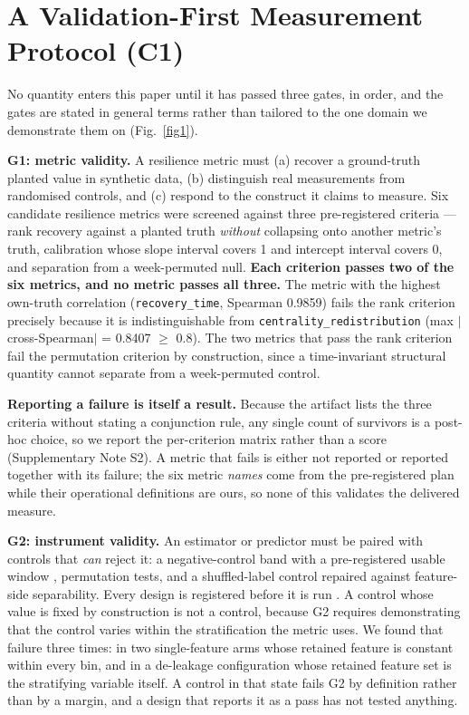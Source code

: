 \section{A Validation-First Measurement Protocol (C1)}

No quantity enters this paper until it has passed three gates, in order, and the
gates are stated in general terms rather than tailored to the one domain we
demonstrate them on (Fig.~\ref{fig1}).

\textbf{G1: metric validity.} A resilience metric must (a) recover a
ground-truth planted value in synthetic data, (b) distinguish real measurements
from randomised controls, and (c) respond to the construct it claims to measure.
Six candidate resilience metrics were screened against three pre-registered
criteria --- rank recovery against a planted truth \emph{without} collapsing onto
another metric's truth, calibration whose slope interval covers 1 and intercept
interval covers 0, and separation from a week-permuted null. \textbf{Each
criterion passes two of the six metrics, and no metric passes all three.} The
metric with the highest own-truth correlation (\texttt{recovery\_time}, Spearman
0.9859) fails the rank criterion precisely because it is indistinguishable from
\texttt{centrality\_redistribution} (max $|$cross-Spearman$|$ = 0.8407 $\geq$
0.8). The two metrics that pass the rank criterion fail the permutation
criterion by construction, since a time-invariant structural quantity cannot
separate from a week-permuted control.

\textbf{Reporting a failure is itself a result.} Because the artifact lists the
three criteria without stating a conjunction rule, any single count of survivors
is a post-hoc choice, so we report the per-criterion matrix rather than a score
(Supplementary Note S2). A metric that fails is either not reported or reported
together with its failure; the six metric \emph{names} come from the
pre-registered plan while their operational definitions are ours, so none of
this validates the delivered measure.

\textbf{G2: instrument validity.} An estimator or predictor must be paired with
controls that \emph{can} reject it: a negative-control band with a pre-registered
usable window \citep{lipsitch2010negative}, permutation tests, and a
shuffled-label control repaired against feature-side separability. Every design
is registered before it is run \citep{nosek2018preregistration}. A control whose
value is fixed by construction is not a control, because G2 requires
demonstrating that the control varies within the stratification the metric uses.
We found that failure three times: in two single-feature arms whose retained
feature is constant within every bin, and in a de-leakage configuration whose
retained feature set is the stratifying variable itself. A control in that state
fails G2 by definition rather than by a margin, and a design that reports it as a
pass has not tested anything.

